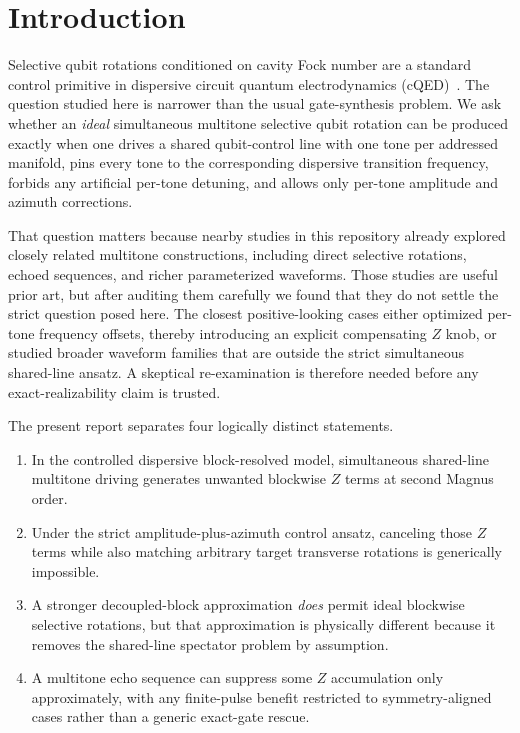 \documentclass[aps,pra,twocolumn,reprint,floatfix,amsmath,amssymb]{revtex4-2}
\begin{document}
\maketitle

\section{Introduction}

Selective qubit rotations conditioned on cavity Fock number are a standard control primitive in dispersive circuit quantum electrodynamics (cQED)~\cite{blais2004cavity,blais2021circuit,koch2007transmon}. The question studied here is narrower than the usual gate-synthesis problem. We ask whether an \emph{ideal} simultaneous multitone selective qubit rotation can be produced exactly when one drives a shared qubit-control line with one tone per addressed manifold, pins every tone to the corresponding dispersive transition frequency, forbids any artificial per-tone detuning, and allows only per-tone amplitude and azimuth corrections.

That question matters because nearby studies in this repository already explored closely related multitone constructions, including direct selective rotations, echoed sequences, and richer parameterized waveforms. Those studies are useful prior art, but after auditing them carefully we found that they do not settle the strict question posed here. The closest positive-looking cases either optimized per-tone frequency offsets, thereby introducing an explicit compensating \(Z\) knob, or studied broader waveform families that are outside the strict simultaneous shared-line ansatz. A skeptical re-examination is therefore needed before any exact-realizability claim is trusted.

The present report separates four logically distinct statements.
\begin{enumerate}
  \item In the controlled dispersive block-resolved model, simultaneous shared-line multitone driving generates unwanted blockwise \(Z\) terms at second Magnus order.
  \item Under the strict amplitude-plus-azimuth control ansatz, canceling those \(Z\) terms while also matching arbitrary target transverse rotations is generically impossible.
  \item A stronger decoupled-block approximation \emph{does} permit ideal blockwise selective rotations, but that approximation is physically different because it removes the shared-line spectator problem by assumption.
  \item A multitone echo sequence can suppress some \(Z\) accumulation only approximately, with any finite-pulse benefit restricted to symmetry-aligned cases rather than a generic exact-gate rescue.
\end{enumerate}
\end{document}

